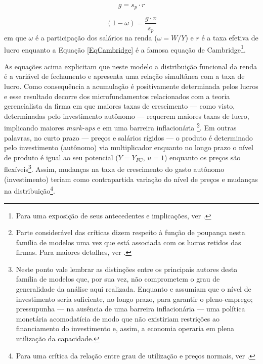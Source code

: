 \begin{equation}
\label{EqCambridge}
g = s_p\cdot r
\end{equation}

\begin{equation}
\label{Cambridge}
(1-\omega) = \frac{g\cdot v}{s_p}
\end{equation}
em que $\omega$ é a participação dos salários na renda ($\omega = W/Y$) e $r$ é a taxa efetiva de lucro enquanto a Equação \ref{EqCambridge} é a famosa equação de Cambridge\footnote{
	Para uma exposição de seus antecedentes e implicações, ver \textcite{bortis_notes_1993}.
}.


As equações acima explicitam que neste modelo a distribuição funcional da renda é a variável de fechamento  e apresenta uma relação simultânea com a taxa de lucro. Como consequência a acumulação é positivamente determinada pelos lucros e esse resultado decorre dos microfundamentos relacionados com a teoria gerencialista da firma em que maiores taxas de crescimento --- como visto, determinadas pelo investimento autônomo --- requerem maiores taxas de lucro, implicando maiores \textit{mark-ups} e em uma barreira inflacionária \cite[p.~353]{lavoie_post-keynesian_2015} \footnote{Parte considerável das críticas dizem respeito à função de poupança nesta família de modelos uma vez que está associada com os lucros retidos das firmas. Para maiores detalhes, ver  \textcites[Seção III]{skott_kaldoriansaving_1981}{marglin_foundation_1984}{skott_kaldors_1989}.}. 
Em outras palavras, no curto prazo --- preços e salários rígidos --- o produto é determinado pelo investimento (autônomo) via multiplicador enquanto no longo prazo o nível de produto é igual ao seu potencial ($Y = Y_{FC}, \,u=1$) enquanto os preços são flexíveis\footnote{
	Neste ponto vale lembrar as distinções entre os principais autores desta família de modelos que, por sua vez, não comprometem o grau de generalidade da análise aqui realizada. Enquanto \textcite[5--6]{kaldor_alternative_1955} e \textcite{pasinetti_rate_1962} assumiam que o nível de investimento seria suficiente, no longo prazo, para garantir o pleno-emprego; \textcite{robinson_model_1962} pressupunha --- na ausência de uma barreira inflacionária --- uma política monetária acomodatícia de modo que não existiriam restrições ao financiamento do investimento e, assim, a economia operaria em plena utilização da capacidade.
}. Assim, mudanças na taxa de crescimento do gasto autônomo (investimento) teriam como contrapartida variação do nível de preços e mudanças na distribuição\footnote{Para uma crítica da relação entre grau de utilização e preços normais, ver \textcite{ciccone_2017}.}. 

